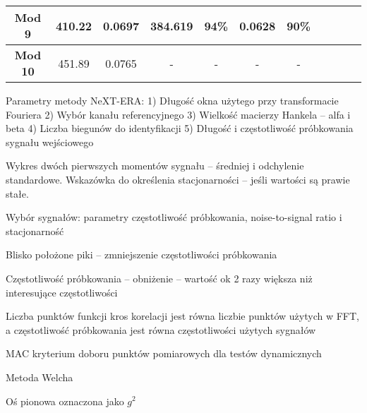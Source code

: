 \begin{table}[]
{\begin{tabular}{@{}c|c|c|cccc|llll@{}}
			\textbf{Mod 9}        & 410.22                                                             & 0.0697                                                                 & 384.619           & 94\%              & 0.0628           & 90\%              &                                       &                                       &                                      &                                       \\ \midrule
			\textbf{Mod 10}       & 451.89                                                             & 0.0765                                                                 & -                 & -                 & -                & -                 &                                       &                                       &                                      &                                       \\ \bottomrule
	\end{tabular}}
	
\end{table}


Parametry metody NeXT-ERA: \parencite{caicedo_practical_2011}
1)	Długość okna użytego przy transformacie Fouriera
2)	Wybór kanału referencyjnego
3)	Wielkość macierzy Hankela – alfa i beta
4)	Liczba biegunów do identyfikacji
5)	Długość i częstotliwość próbkowania sygnału wejściowego

Wykres dwóch pierwszych momentów sygnału – średniej i odchylenie standardowe. Wskazówka do określenia stacjonarności – jeśli wartości są prawie stałe. \parencite{caicedo_practical_2011,bendat_random_2011}


Wybór sygnałów: parametry częstotliwość próbkowania, noise-to-signal ratio i stacjonarność


Blisko położone piki – zmniejszenie częstotliwości próbkowania \parencite{caicedo_practical_2011}


Częstotliwość próbkowania – obniżenie – wartość ok 2 razy większa niż interesujące częstotliwości \parencite{caicedo_practical_2011}


Liczba punktów funkcji kros korelacji jest równa liczbie punktów użytych w FFT, a częstotliwość próbkowania jest równa częstotliwości użytych sygnałów \parencite{caicedo_practical_2011}

MAC kryterium doboru punktów pomiarowych dla testów dynamicznych 


Metoda Welcha \parencite{welch_use_1967}


Oś pionowa oznaczona jako $g^2$ \parencite{caicedo_practical_2011}

